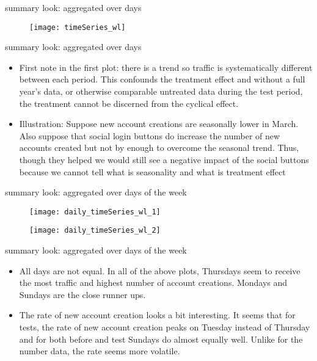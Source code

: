 \documentclass{beamer}
\begin{document}
		\begin{frame}{summary look: aggregated over days}
			\begin{figure}[H]
				\centering
				\texttt{[image: timeSeries\_wl]}
			\end{figure}
		\end{frame}
		
		\begin{frame}{summary look: aggregated over days}
			\begin{itemize}
				\item First note in the first plot: there is a trend so traffic is systematically different between each period. This confounds the treatment effect and without a full year's data, or otherwise comparable untreated data during the test period, the treatment cannot be discerned from the cyclical effect.
				
				\item Illustration: Suppose new account creations are seasonally lower in March. Also suppose that social login buttons do increase the number of new accounts created but not by enough to overcome the seasonal trend. Thus, though they helped we would still see a negative impact of the social buttons because we cannot tell what is seasonality and what is treatment effect
			\end{itemize}
		\end{frame}
		
		\begin{frame}{summary look: aggregated over days of the week}
			\begin{figure}[H]
				\centering
				\texttt{[image: daily\_timeSeries\_wl\_1]}
			\end{figure}
			
			\begin{figure}[H]
				\centering
				\texttt{[image: daily\_timeSeries\_wl\_2]}
			\end{figure}
		\end{frame}
		
		\begin{frame}{summary look: aggregated over days of the week}
			\begin{itemize}
				\item All days are not equal. In all of the above plots, Thursdays seem to receive the most traffic and highest number of account creations. Mondays and Sundays are the close runner ups. 
				
				\item The rate of new account creation looks a bit interesting. It seems that for tests, the rate of new account creation peaks on Tuesday instead of Thursday and for both before and test Sundays do almost equally well. Unlike for the number data, the rate seems more volatile.
			\end{itemize}
		\end{frame}
		
\end{document}
